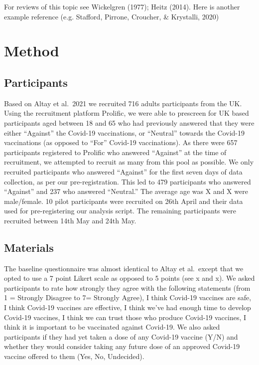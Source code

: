 \documentclass[
  english,
  ,jou,floatsintext]{apa6}
\begin{document}
For reviews of this topic see Wickelgren (1977); Heitz (2014). Here is another example reference (e.g. Stafford, Pirrone, Croucher, \& Krystalli, 2020)

\hypertarget{method}{%
\section{Method}\label{method}}

\hypertarget{participants}{%
\subsection{Participants}\label{participants}}

Based on Altay et al.~2021 we recruited 716 adults participants from the UK. Using the recruitment platform Prolific, we were able to prescreen for UK based participants aged between 18 and 65 who had previously answered that they were either ``Against'' the Covid-19 vaccinations, or ``Neutral'' towards the Covid-19 vaccinations (as opposed to ``For'' Covid-19 vaccinations). As there were 657 participants registered to Prolific who answered ``Against'' at the time of recruitment, we attempted to recruit as many from this pool as possible. We only recruited participants who answered ``Against'' for the first seven days of data collection, as per our pre-registration. This led to 479 participants who answered ``Against'' and 237 who answered ``Neutral.'' The average age was X and X were male/female. 10 pilot participants were recruited on 26th April and their data used for pre-registering our analysis script. The remaining participants were recruited between 14th May and 24th May.

\hypertarget{materials}{%
\subsection{Materials}\label{materials}}

The baseline questionnaire was almost identical to Altay et al.~except that we opted to use a 7 point Likert scale as opposed to 5 points (see x and x). We asked participants to rate how strongly they agree with the following statements (from 1 = Strongly Disagree to 7= Strongly Agree), I think Covid-19 vaccines are safe, I think Covid-19 vaccines are effective, I think we've had enough time to develop Covid-19 vaccines, I think we can trust those who produce Covid-19 vaccines, I think it is important to be vaccinated against Covid-19. We also asked participants if they had yet taken a dose of any Covid-19 vaccine (Y/N) and whether they would consider taking any future dose of an approved Covid-19 vaccine offered to them (Yes, No, Undecided).
\end{document}
